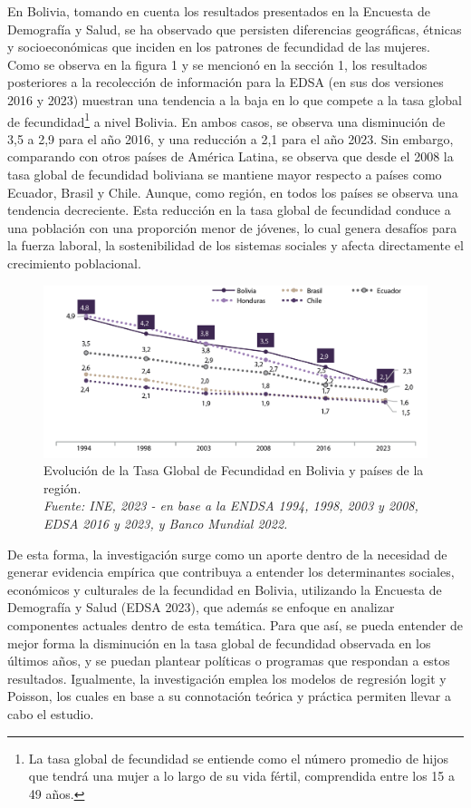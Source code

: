 \documentclass[Royal,times,sageh]{sagej}
\begin{document}
En Bolivia, tomando en cuenta los resultados presentados en la Encuesta
de Demografía y Salud, se ha observado que persisten diferencias
geográficas, étnicas y socioeconómicas que inciden en los patrones de
fecundidad de las mujeres. Como se observa en la figura 1 y se mencionó
en la sección 1, los resultados posteriores a la recolección de
información para la EDSA (en sus dos versiones 2016 y 2023) muestran una
tendencia a la baja en lo que compete a la tasa global de
fecundidad\footnote{La tasa global de fecundidad se entiende como el
  número promedio de hijos que tendrá una mujer a lo largo de su vida
  fértil, comprendida entre los 15 a 49 años.} a nivel Bolivia. En ambos
casos, se observa una disminución de 3,5 a 2,9 para el año 2016, y una
reducción a 2,1 para el año 2023. Sin embargo, comparando con otros
países de América Latina, se observa que desde el 2008 la tasa global de
fecundidad boliviana se mantiene mayor respecto a países como Ecuador,
Brasil y Chile. Aunque, como región, en todos los países se observa una
tendencia decreciente. Esta reducción en la tasa global de fecundidad
conduce a una población con una proporción menor de jóvenes, lo cual
genera desafíos para la fuerza laboral, la sostenibilidad de los
sistemas sociales y afecta directamente el crecimiento poblacional.

\begin{figure}

{\centering \includegraphics[width=1\linewidth]{imagenes/foto1} 

}

\caption{Evolución de la Tasa Global de Fecundidad en Bolivia y países de la región.\\\textit{Fuente: INE, 2023 - en base a la ENDSA 1994, 1998, 2003 y 2008, EDSA 2016 y 2023, y Banco Mundial 2022.}}\label{fig:unnamed-chunk-1}
\end{figure}

De esta forma, la investigación surge como un aporte dentro de la
necesidad de generar evidencia empírica que contribuya a entender los
determinantes sociales, económicos y culturales de la fecundidad en
Bolivia, utilizando la Encuesta de Demografía y Salud (EDSA 2023), que
además se enfoque en analizar componentes actuales dentro de esta
temática. Para que así, se pueda entender de mejor forma la disminución
en la tasa global de fecundidad observada en los últimos años, y se
puedan plantear políticas o programas que respondan a estos resultados.
Igualmente, la investigación emplea los modelos de regresión logit y
Poisson, los cuales en base a su connotación teórica y práctica permiten
llevar a cabo el estudio.
\end{document}
